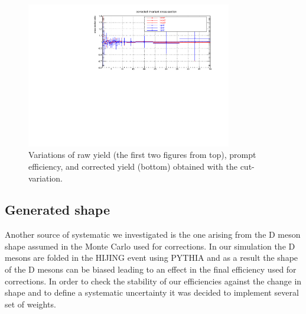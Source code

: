 \begin{figure}[tb]
\begin{center}
 \includegraphics[width=0.8\textwidth]{figures/Dstar/pp13TeV/corrected-yield-ratio-cut-var-v2.pdf}
\caption{Variations of raw yield (the first two figures from top), prompt  efficiency, and corrected yield (bottom) obtained with the cut-variation.}
\label{fig:DstarCutVar010}
\end{center}
\end{figure}


\clearpage
\subsection{Generated \pt shape}
\label{sec:gen_pt_syst}
Another source of systematic we investigated is the one arising from the D meson \pt shape assumed in the Monte Carlo used for corrections. In our simulation the D mesons are folded in the HIJING event using PYTHIA and as a result the \pt shape of the D mesons can be biased leading to an effect in the final efficiency used for corrections. In order to check the stability of our efficiencies against the change in \pt shape and to define a systematic uncertainty it was decided to implement several set of weights. 



